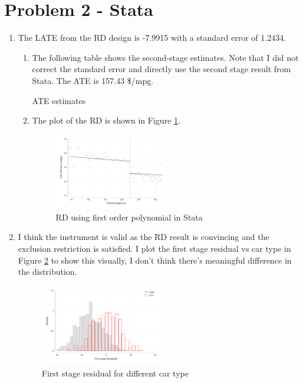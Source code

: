\documentclass{article}
\begin{document}
\section*{Problem 2 - Stata}
\begin{enumerate}
    \item The LATE from the RD design is -7.9915 with a standard error of 1.2434.
    \begin{enumerate}
        \item The following table shows the second-stage estimates. Note that I did not correct the standard error and directly use the second stage result from Stata. The ATE is 157.43 \$/mpg.
        \begin{table}[H]\centering
            \caption{ATE estimates}
            \label{t:RD_stata}
            \begin{threeparttable}
            
            \end{threeparttable}
            \end{table}
        \item The plot of the RD is shown in Figure \ref{f:RD_stata}.
        \begin{figure}[H]
            \centering
            \includegraphics[width=0.5\textwidth]{./figure/RD.pdf}
            \caption{RD using first order polynomial in Stata}
            \label{f:RD_stata} 
        \end{figure}
    \end{enumerate}
    \item I think the instrument is valid as the RD result is convincing and the exclusion restriction is satisfied. I plot the first stage residual vs car type in Figure \ref{f:1st_stage} to show this visually, I don't think there's meaningful difference in the distribution.
    \begin{figure}[H]
        \centering
        \includegraphics[width=0.5\textwidth]{./figure/exclusion.pdf}
        \caption{First stage residual for different car type}
        \label{f:1st_stage}
    \end{figure}
\end{enumerate}
\end{document}
